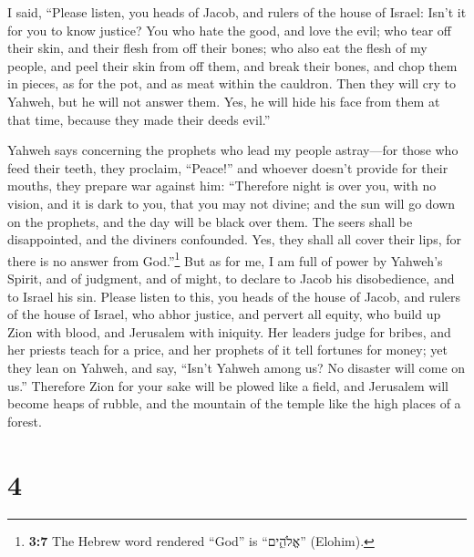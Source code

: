  I said, ``Please listen, you heads of Jacob, and rulers
of the house of Israel: Isn't it for you to know justice? 
You who hate the good, and love the evil; who tear off their skin, and
their flesh from off their bones;  who also eat the flesh
of my people, and peel their skin from off them, and break their bones,
and chop them in pieces, as for the pot, and as meat within the
cauldron.  Then they will cry to Yahweh, but he will not
answer them. Yes, he will hide his face from them at that time, because
they made their deeds evil.''

 Yahweh says concerning the prophets who lead my people
astray---for those who feed their teeth, they proclaim, ``Peace!'' and
whoever doesn't provide for their mouths, they prepare war against him:
 ``Therefore night is over you, with no vision, and it is
dark to you, that you may not divine; and the sun will go down on the
prophets, and the day will be black over them.  The seers
shall be disappointed, and the diviners confounded. Yes, they shall all
cover their lips, for there is no answer from God.''\footnote{\textbf{3:7}
  The Hebrew word rendered ``God'' is ``אֱלֹהִ֑ים'' (Elohim).}
 But as for me, I am full of power by Yahweh's Spirit, and
of judgment, and of might, to declare to Jacob his disobedience, and to
Israel his sin.  Please listen to this, you heads of the
house of Jacob, and rulers of the house of Israel, who abhor justice,
and pervert all equity,  who build up Zion with blood,
and Jerusalem with iniquity.  Her leaders judge for
bribes, and her priests teach for a price, and her prophets of it tell
fortunes for money; yet they lean on Yahweh, and say, ``Isn't Yahweh
among us? No disaster will come on us.''  Therefore Zion
for your sake will be plowed like a field, and Jerusalem will become
heaps of rubble, and the mountain of the temple like the high places of
a forest.

\hypertarget{section-3}{%
\section{4}\label{section-3}}

